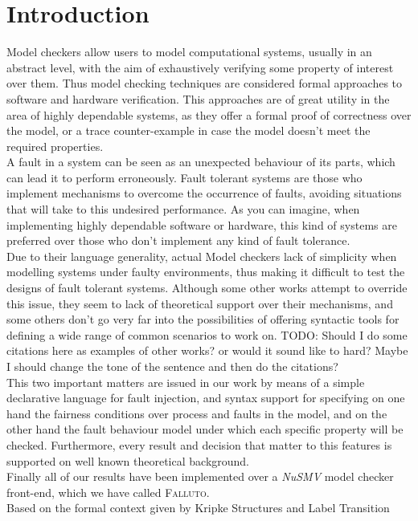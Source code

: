 \documentclass[12pt]{llncs2e/llncs}
\newcommand{\falluto}{\mbox{\textsc{Falluto}}}
\newcommand{\todo}[1]{{\color{red}TODO: #1}}
\begin{document}
\section{Introduction}
Model checkers allow users to model computational systems, usually in an
abstract level, with the aim of exhaustively verifying some property of
interest over them. Thus model checking techniques are considered formal
approaches to software and hardware verification. This approaches are of great
utility in the area of highly dependable systems, as they offer a formal proof
of correctness over the model, or a trace counter-example in case the model
doesn't meet the required properties.\\
A fault in a system can be seen as an unexpected behaviour of its parts, which
can lead it to perform erroneously. Fault tolerant systems are those who
implement mechanisms to overcome the occurrence of faults, avoiding situations
that will take to this undesired performance. As you can imagine, when
implementing highly dependable software or hardware, this kind of systems are
preferred over those who don't implement any kind of fault tolerance.\\
Due to their language generality, actual Model checkers lack of simplicity when
modelling systems under faulty environments, thus making it difficult to test
the designs of fault tolerant systems. Although some other works attempt to
override this issue, they seem to lack of theoretical support over their
mechanisms, and some others don't go very far into the possibilities
of offering syntactic tools for defining a wide range of common scenarios to
work on. \todo{Should I do some citations here as examples of other works?
or would it sound like to hard? Maybe I should change the tone of the sentence
and then do the citations?}\\ 
This two important matters are issued in our work by means of a simple
declarative language for fault injection, and syntax support for specifying
on one hand the fairness conditions over process and faults in the model, and 
on the other hand the fault behaviour model under which each specific property
will be checked. Furthermore, every result and decision that matter to this
features is supported on well known theoretical background.\\
Finally all of our results have been implemented over a
\mbox{\textit{NuSMV}}\cite{cimatti} model checker front-end, which we have called
\falluto.\\
Based on the formal context given by Kripke Structures and Label Transition 
\end{document}
